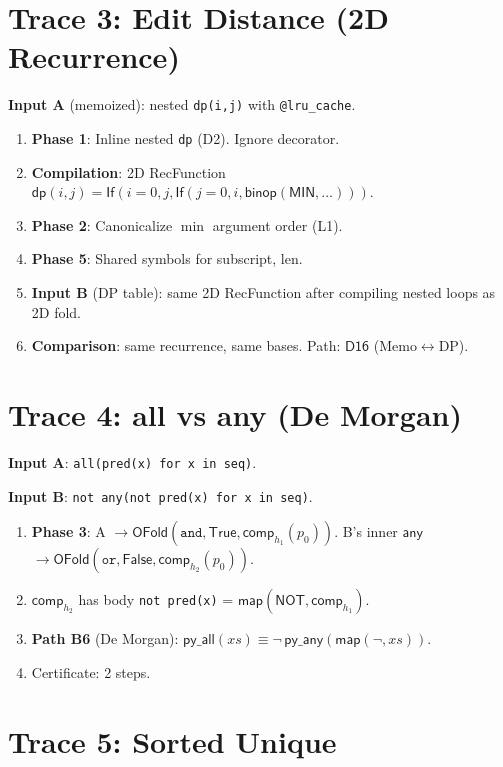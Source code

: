 \documentclass[11pt,a4paper]{report}
\theoremstyle{definition}
\theoremstyle{plain}
\begin{document}
\section{Trace 3: Edit Distance (2D Recurrence)}

\textbf{Input A} (memoized): nested \texttt{dp(i,j)} with \texttt{@lru\_cache}.

\begin{enumerate}
  \item \textbf{Phase 1}: Inline nested \texttt{dp} (D2).  Ignore decorator.
  \item \textbf{Compilation}: 2D RecFunction $\mathsf{dp}(i,j) =
    \mathsf{If}(i=0, j, \mathsf{If}(j=0, i,
    \mathsf{binop}(\mathsf{MIN}, \ldots)))$.
  \item \textbf{Phase 2}: Canonicalize $\min$ argument order (L1).
  \item \textbf{Phase 5}: Shared symbols for subscript, len.
  \item \textbf{Input B} (DP table): same 2D RecFunction after
    compiling nested loops as 2D fold.
  \item \textbf{Comparison}: same recurrence, same bases.
    Path: $\mathsf{D16}$ (Memo$\leftrightarrow$DP).
\end{enumerate}

\section{Trace 4: all vs any (De Morgan)}

\textbf{Input A}: \texttt{all(pred(x) for x in seq)}.

\textbf{Input B}: \texttt{not any(not pred(x) for x in seq)}.

\begin{enumerate}
  \item \textbf{Phase 3}: A $\to \mathsf{OFold}(\texttt{and},
    \mathsf{True}, \mathsf{comp}_{h_1}(p_0))$.
    B's inner $\mathsf{any}$ $\to \mathsf{OFold}(\texttt{or},
    \mathsf{False}, \mathsf{comp}_{h_2}(p_0))$.
  \item $\mathsf{comp}_{h_2}$ has body \texttt{not pred(x)} =
    $\mathsf{map}(\mathsf{NOT}, \mathsf{comp}_{h_1})$.
  \item \textbf{Path B6} (De Morgan): $\mathsf{py\_all}(xs) \equiv
    \lnot\,\mathsf{py\_any}(\mathsf{map}(\lnot, xs))$.
  \item Certificate: 2 steps.
\end{enumerate}

\section{Trace 5: Sorted Unique}
\end{document}
